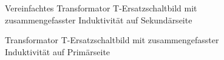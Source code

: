 \begin{figure}[!htbp]
    
    \caption{Vereinfachtes Transformator T-Ersatzschaltbild mit zusammengefasster Induktivität auf Sekundärseite}
    \label{fig:transformertequivalent3}
\end{figure}

\begin{figure}[!htbp]
    
    \caption{Transformator T-Ersatzschaltbild mit zusammengefasster Induktivität auf Primärseite}
    \label{fig:transformertequivalent4}
\end{figure}

\clearpage


\setcounter{page}{\thesavepage}

\printbibliography[heading=bibintoc,title={Literaturverzeichnis}]

\clearpage


\printnoidxglossary[style=long,title={Glossar}]

\clearpage


